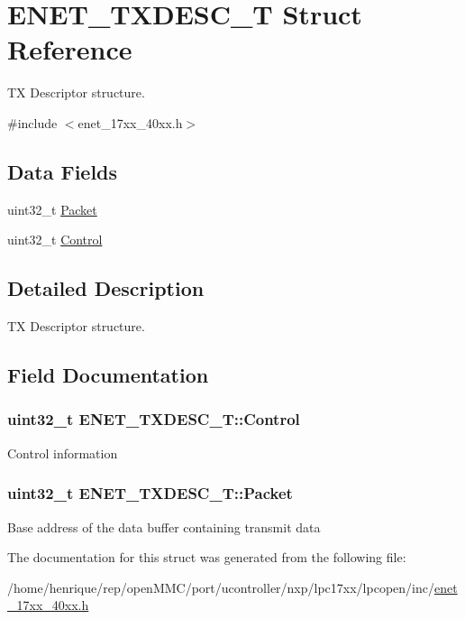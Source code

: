 \hypertarget{structENET__TXDESC__T}{\section{E\-N\-E\-T\-\_\-\-T\-X\-D\-E\-S\-C\-\_\-\-T Struct Reference}
\label{structENET__TXDESC__T}
}


T\-X Descriptor structure.  




{\ttfamily \#include $<$enet\-\_\-17xx\-\_\-40xx.\-h$>$}

\subsection*{Data Fields}
\begin{DoxyCompactItemize}
\item 
uint32\-\_\-t \hyperlink{structENET__TXDESC__T_aa32276326b2e5e4157e59d0f5553bae3}{Packet}
\item 
uint32\-\_\-t \hyperlink{structENET__TXDESC__T_a7bbcf3f7943ab87b784dbca19e2698d5}{Control}
\end{DoxyCompactItemize}


\subsection{Detailed Description}
T\-X Descriptor structure. 

\subsection{Field Documentation}
\hypertarget{structENET__TXDESC__T_a7bbcf3f7943ab87b784dbca19e2698d5}{
\subsubsection[{Control}]{\setlength{\rightskip}{0pt plus 5cm}uint32\-\_\-t E\-N\-E\-T\-\_\-\-T\-X\-D\-E\-S\-C\-\_\-\-T\-::\-Control}}\label{structENET__TXDESC__T_a7bbcf3f7943ab87b784dbca19e2698d5}
Control information \hypertarget{structENET__TXDESC__T_aa32276326b2e5e4157e59d0f5553bae3}{
\subsubsection[{Packet}]{\setlength{\rightskip}{0pt plus 5cm}uint32\-\_\-t E\-N\-E\-T\-\_\-\-T\-X\-D\-E\-S\-C\-\_\-\-T\-::\-Packet}}\label{structENET__TXDESC__T_aa32276326b2e5e4157e59d0f5553bae3}
Base address of the data buffer containing transmit data 

The documentation for this struct was generated from the following file\-:\begin{DoxyCompactItemize}
\item 
/home/henrique/rep/open\-M\-M\-C/port/ucontroller/nxp/lpc17xx/lpcopen/inc/\hyperlink{enet__17xx__40xx_8h}{enet\-\_\-17xx\-\_\-40xx.\-h}\end{DoxyCompactItemize}
